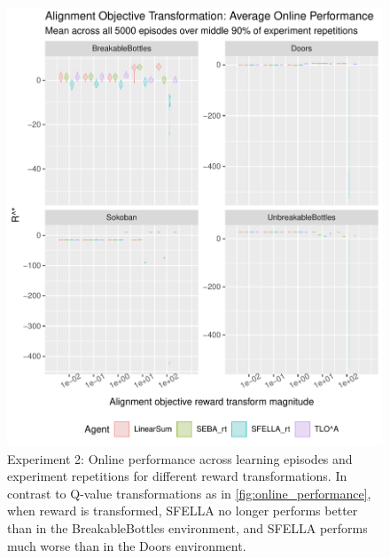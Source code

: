 \begin{figure}
  \includegraphics[width=\columnwidth]{output/multirun_n100_reward_to_util_transformonline_util_transform_Alignment.pdf}
  \caption{Experiment 2: \RStar{} Online performance across learning episodes and experiment repetitions for different reward transformations. In contrast to Q-value transformations as in \ref{fig:online_performance}, when reward is transformed, SFELLA no longer performs better than \tloA{} in the BreakableBottles environment, and SFELLA performs much worse than \tloA{} in the Doors environment.
  }
   \label{fig:online_performance_exp2}
 \end{figure}